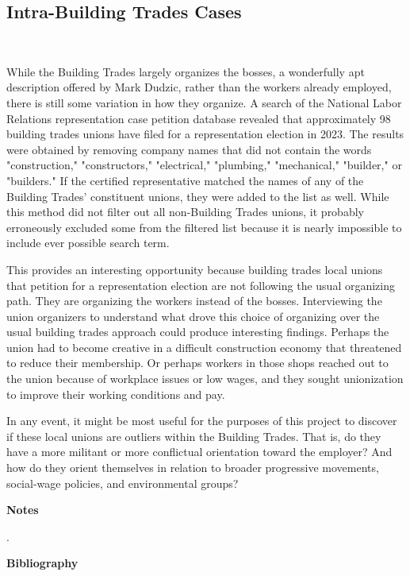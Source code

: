 \documentclass[12pt]{article}
\begin{document}
\subsection{Intra-Building Trades Cases} \

While the Building Trades largely organizes the bosses, a wonderfully apt description offered by Mark Dudzic, rather than the workers already employed, there is still some variation in how they organize. A search of the National Labor Relations representation case petition database revealed that approximately 98 building trades unions have filed for a representation election in 2023. The results were obtained by removing company names that did not contain the words "construction," "constructors," "electrical," "plumbing," "mechanical," "builder," or "builders." If the certified representative matched the names of any of the Building Trades’ constituent unions, they were added to the list as well. While this method did not filter out all non-Building Trades unions, it probably erroneously excluded some from the filtered list because it is nearly impossible to include ever possible search term.

This provides an interesting opportunity because building trades local unions that petition for a representation election are not following the usual organizing path. They are organizing the workers instead of the bosses. Interviewing the union organizers to understand what drove this choice of organizing over the usual building trades approach could produce interesting findings. Perhaps the union had to become creative in a difficult construction economy that threatened to reduce their membership. Or perhaps workers in those shops reached out to the union because of workplace issues or low wages, and they sought unionization to improve their working conditions and pay.

In any event, it might be most useful for the purposes of this project to discover if these local unions are outliers within the Building Trades. That is, do they have a more militant or more conflictual orientation toward the employer? And how do they orient themselves in relation to broader progressive movements, social-wage policies, and environmental groups? 

\newpage

\begin{center}
{\bfseries Notes}
\end{center}

\noindent
.
\newpage
\begin{center}
{\bfseries Bibliography}
\end{center}

\end{document}
